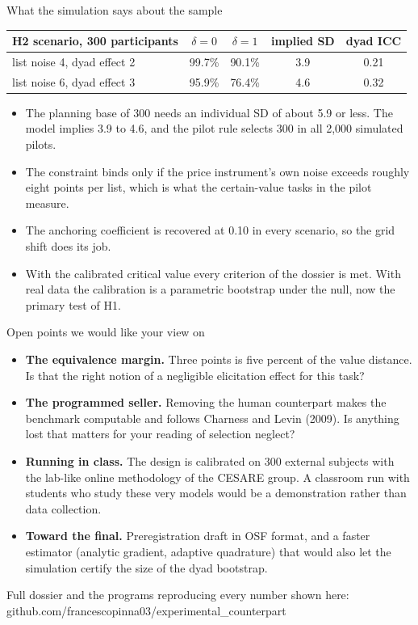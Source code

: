 \documentclass[aspectratio=169,11pt]{beamer}
\begin{document}
\begin{frame}{What the simulation says about the sample}
\begin{center}\small
\begin{tabular}{lcccc}
\toprule
H2 scenario, 300 participants & $\delta=0$ & $\delta=1$ & implied SD & dyad ICC\\
\midrule
list noise 4, dyad effect 2 & 99.7\% & 90.1\% & 3.9 & 0.21\\
list noise 6, dyad effect 3 & 95.9\% & 76.4\% & 4.6 & 0.32\\
\bottomrule
\end{tabular}
\end{center}
\begin{itemize}\small
\item The planning base of 300 needs an individual SD of about 5.9 or less. The model implies 3.9 to 4.6, and the pilot rule selects 300 in all 2,000 simulated pilots.
\item The constraint binds only if the price instrument's own noise exceeds roughly eight points per list, which is what the certain-value tasks in the pilot measure.
\item The anchoring coefficient is recovered at 0.10 in every scenario, so the grid shift does its job.
\item With the calibrated critical value every criterion of the dossier is met. With real data the calibration is a parametric bootstrap under the null, now the primary test of H1.
\end{itemize}
\end{frame}

\begin{frame}{Open points we would like your view on}
\begin{itemize}
\item \textbf{The equivalence margin.} Three points is five percent of the value distance. Is that the right notion of a negligible elicitation effect for this task?
\item \textbf{The programmed seller.} Removing the human counterpart makes the benchmark computable and follows Charness and Levin (2009). Is anything lost that matters for your reading of selection neglect?
\item \textbf{Running in class.} The design is calibrated on 300 external subjects with the lab-like online methodology of the CESARE group. A classroom run with students who study these very models would be a demonstration rather than data collection.
\item \textbf{Toward the final.} Preregistration draft in OSF format, and a faster estimator (analytic gradient, adaptive quadrature) that would also let the simulation certify the size of the dyad bootstrap.
\end{itemize}
\vfill
{\footnotesize Full dossier and the programs reproducing every number shown here: github.com/francescopinna03/experimental\_counterpart}
\end{frame}
\end{document}
